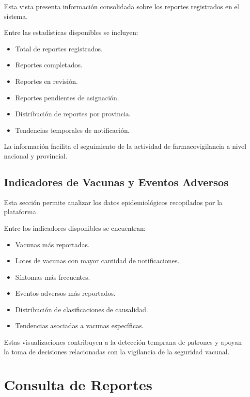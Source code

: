 \documentclass[12pt,a4paper]{report}
\begin{document}
Esta vista presenta información consolidada sobre los reportes registrados en el sistema.

Entre las estadísticas disponibles se incluyen:

\begin{itemize}
\item Total de reportes registrados.
\item Reportes completados.
\item Reportes en revisión.
\item Reportes pendientes de asignación.
\item Distribución de reportes por provincia.
\item Tendencias temporales de notificación.
\end{itemize}

La información facilita el seguimiento de la actividad de farmacovigilancia a nivel nacional y provincial.

\subsection{Indicadores de Vacunas y Eventos Adversos}

Esta sección permite analizar los datos epidemiológicos recopilados por la plataforma.

Entre los indicadores disponibles se encuentran:

\begin{itemize}
\item Vacunas más reportadas.
\item Lotes de vacunas con mayor cantidad de notificaciones.
\item Síntomas más frecuentes.
\item Eventos adversos más reportados.
\item Distribución de clasificaciones de causalidad.
\item Tendencias asociadas a vacunas específicas.
\end{itemize}

Estas visualizaciones contribuyen a la detección temprana de patrones y apoyan la toma de decisiones relacionadas con la vigilancia de la seguridad vacunal.





\section{Consulta de Reportes}
\end{document}
